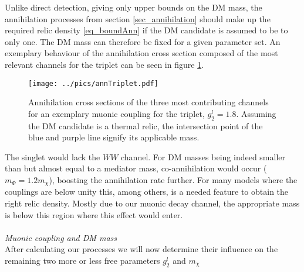 % 
% 
% 
% 
% 
\noindent Unlike direct detection, giving only upper bounds on the DM mass, the annihilation processes from section \ref{sec_annihilation} should
make up the required relic density \eqref{eq_boundAnn} if the DM candidate is assumed to be to only one. The DM mass can therefore be fixed for a
given parameter set. An exemplary behaviour of the annihilation cross section composed of the most relevant channels for the triplet can be seen in 
figure \ref{pic_annTriplet}. 
 \begin{figure}[t]
  \texttt{[image: ../pics/annTriplet.pdf]}
  \caption{Annihilation cross sections of the three most contributing channels for an exemplary muonic coupling for the triplet, $g_2^l=1.8$. 
  Assuming the DM candidate is a thermal relic, the intersection point of the blue and purple line signify its applicable mass.}
  \label{pic_annTriplet} %
 \end{figure}
The singlet would lack the $WW$ channel. For DM masses being indeed smaller than but almost equal to a mediator mass,
co-annihilation would occur ($m_\Phi = 1.2 m_\chi$), boosting the annihilation rate further. For many models where the couplings are below unity
this, among others, is a needed feature to obtain the right relic density. Mostly due to our muonic decay channel, the appropriate mass is below
this region where this effect would enter. 
\\ \\ \textit{Muonic coupling and DM mass}\\
\noindent After calculating our processes we will now determine their influence on the remaining two more or less free parameters $g_2^l$ and $m_\chi$
